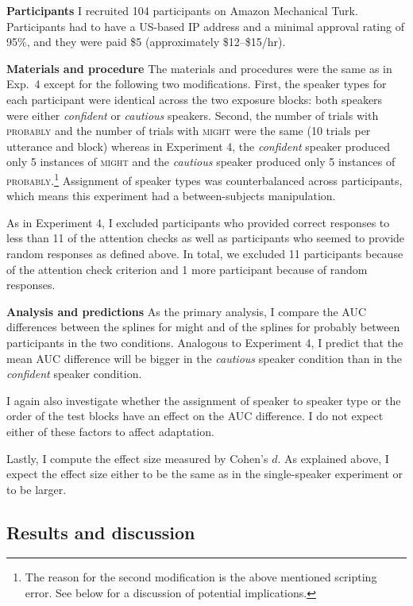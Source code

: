 \noindent \textbf{Participants} I recruited 104 participants on Amazon Mechanical Turk. 
Participants had to have a US-based IP address and a minimal approval rating of 
95\%, and they were paid \$5 (approximately \$12--\$15/hr).  

\noindent \textbf{Materials and procedure} The materials and procedures were the same as in Exp.~4 except for the following two modifications.
First, the speaker types for each participant were identical across the two exposure blocks: both speakers were either \textit{confident} or \textit{cautious} speakers.
Second, the number of trials with \textsc{probably} and the number of trials with \textsc{might} were the same (10 trials per utterance and block) whereas in Experiment 4, the \textit{confident} speaker
 produced only 5 instances of \textsc{might} and the \textit{cautious} speaker produced  only 5 instances of \textsc{probably}.\footnote{The reason for the second modification is the above mentioned scripting error. See below for a discussion of potential implications.} Assignment of speaker types was counterbalanced across participants, which means this experiment had a between-subjects manipulation.

  
As in Experiment 4, I excluded participants who provided correct responses to less than 11 of the attention checks as well as participants who seemed to provide random responses as defined above. In total, we excluded 11 participants because of the attention check criterion and 1 more participant because of random responses. 


\noindent \textbf{Analysis and predictions} 
As the primary analysis, I compare the AUC differences between the splines for 
{\sc might} and of the splines for {\sc probably} between participants in the two conditions.
Analogous to Experiment 4, I predict that the mean AUC difference
will be bigger in the \emph{cautious} speaker condition than in the \emph{confident} speaker condition.

I again also investigate whether the assignment of speaker to speaker type or the order 
of the test blocks have an effect on the AUC difference. I do not expect either of these factors
to affect adaptation.

Lastly, I compute the effect size measured by Cohen's $d$. As explained above, I expect
the effect size either to be the same as in the single-speaker experiment or to be larger. 


\subsection{Results and discussion}

